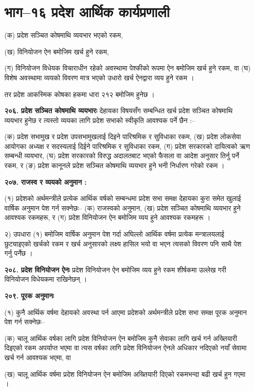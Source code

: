 \section{भाग–१६ प्रदेश आर्थिक कार्यप्रणाली}

(क) प्रदेश सञ्चित कोषमाथि व्ययभार भएको रकम,

(ख) विनियोजन ऐन बमोजिम खर्च हुने रकम,

(ग) विनियोजन विधेयक विचाराधीन रहेको अवस्थामा पेश्कीको रूपमा ऐन बमोजिम खर्च हुने रकम, वा
(घ) विशेष अवस्थामा व्ययको विवरण मात्र भएको उधारो खर्च ऐनद्वारा व्यय हुने रकम ।

तर प्रदेश आकस्मिक कोषका हकमा धारा २१२ बमोजिम हुनेछ ।

\textbf{२०६. प्रदेश सञ्चित कोषमाथि व्ययभारः} देहायका विषयसँग सम्बन्धित खर्च प्रदेश सञ्चित कोषमाथि व्ययभार हुनेछ र त्यस्तो व्ययका लागि प्रदेश सभाको स्वीकृति आवश्यक पर्ने छैन :–

(क) प्रदेश सभामुख र प्रदेश उपसभामुखलाई दिइने पारिश्रमिक र सुविधाका रकम,
(ख) प्रदेश लोकसेवा आयोगका अध्यक्ष र सदस्यलाई दिईने पारिश्रमिक र सुविधाका रकम,
(ग) प्रदेश सरकारको दायित्वको ऋण सम्बन्धी व्ययभार,
(घ) प्रदेश सरकारको विरुद्ध अदालतबाट भएको फैसला वा आदेश अनुसार तिर्नु पर्ने रकम, र
(ङ) प्रदेश कानूनले प्रदेश सञ्चित कोषमाथि व्ययभार हुने भनी निर्धारण गरेको रकम ।

\textbf{२०७. राजस्व र व्ययको अनुमान :}

(१) प्रदेशको अर्थमन्त्रीले प्रत्येक आर्थिक वर्षको सम्बन्धमा प्रदेश सभा समक्ष देहायका कुरा समेत खुलाई वार्षिक अनुमान
पेश गर्न सक्नेछः–
(क) राजस्वको अनुमान,
(ख) प्रदेश सञ्चित कोषमाथि व्ययभार हुने आवश्यक रकमहरू, र
(ग) प्रदेश विनियोजन ऐन बमोजिम व्यय हुने आवश्यक रकमहरू ।

२) उपधारा (१) बमोजिम वार्षिक अनुमान पेश गर्दा अघिल्लो आर्थिक वर्षमा प्रत्येक मन्त्रालयलाई छुट्याइएको खर्चको रकम र खर्च अनुसारको लक्ष्य हासिल भयो वा भएन त्यसको विवरण पनि साथै पेश गर्नु पर्नेछ ।

\textbf{२०८. प्रदेश विनियोजन ऐनः} प्रदेश विनियोजन ऐन बमोजिम व्यय हुने रकम शीर्षकमा उल्लेख गरी विनियोजन विधेयकमा राखिनेछन् ।

\textbf{२०९. पूरक अनुमानः}

(१) कुनै आर्थिक वर्षमा देहायको अवस्था पर्न आएमा प्रदेशको अर्थमन्त्रीले प्रदेश सभा समक्ष पूरक अनुमान पेश गर्न सक्नेछः–

(क) चालू आर्थिक वर्षका लागि प्रदेश विनियोजन ऐन बमोजिम कुनै सेवाका लागि खर्च गर्न अख्तियारी दिइएको रकम अपर्याप्त भएमा वा त्यस वर्षका लागि प्रदेश विनियोजन ऐनले अधिकार नदिएको नयाँ सेवामा खर्च गर्न आवश्यक भएमा, वा

(ख) चालू आर्थिक वर्षमा प्रदेश विनियोजन ऐन बमोजिम अख्तियारी दिएको रकमभन्दा बढी खर्च हुन गएमा ।

